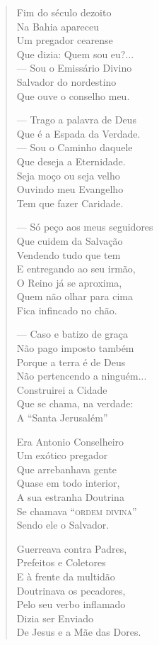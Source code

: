 \begin{verse}
Fim do século dezoito \\
Na Bahia apareceu \\
Um pregador cearense \\
Que dizia: Quem sou eu?... \\
--- Sou o Emissário Divino \\
Salvador do nordestino \\
Que ouve o conselho meu. 

--- Trago a palavra de Deus \\
Que é a Espada da Verdade. \\
--- Sou o Caminho daquele \\
Que deseja a Eternidade. \\
Seja moço ou seja velho \\
Ouvindo meu Evangelho \\
Tem que fazer Caridade. 

--- Só peço aos meus seguidores \\
Que cuidem da Salvação \\
Vendendo tudo que tem \\
E entregando ao seu irmão, \\
O Reino já se aproxima, \\
Quem não olhar para cima \\
Fica infincado no chão. 
\pagebreak

--- Caso e batizo de graça \\
Não pago imposto também \\
Porque a terra é de Deus \\
Não pertencendo a ninguém... \\
Construirei a Cidade \\
Que se chama, na verdade: \\
A ``Santa Jerusalém'' 

Era Antonio Conselheiro \\
Um exótico pregador \\
Que arrebanhava gente \\
Quase em todo interior, \\
A sua estranha Doutrina \\
Se chamava ``\textsc{ordem divina}'' \\
Sendo ele o Salvador. 

Guerreava contra Padres, \\
Prefeitos e Coletores \\
E à frente da multidão \\
Doutrinava os pecadores, \\
Pelo seu verbo inflamado \\
Dizia ser Enviado \\
De Jesus e a Mãe das Dores. 


\end{verse}

